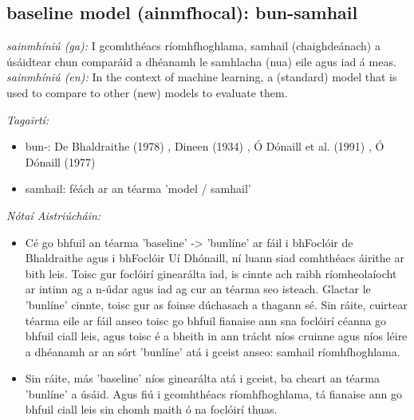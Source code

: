 \documentclass{article}
\begin{document}
\subsection*{baseline model (ainmfhocal): bun-samhail} 
 \noindent \textit{sainmhíniú (ga):} I gcomhthéacs ríomhfhoghlama, samhail (chaighdeánach) a úsáidtear chun comparáid a dhéanamh le samhlacha (nua) eile agus iad á meas.
\newline\newline
 \noindent \textit{sainmhíniú (en):} In the context of machine learning, a (standard) model that is used to compare to other (new) models to evaluate them.
\newline

 \noindent \textit{Tagairtí:}
\begin{itemize}
	\item bun-: De Bhaldraithe (1978) \cite{de-bhaldraithe}, Dineen (1934) \cite{dineen}, Ó Dónaill et al. (1991) \cite{focloir-beag}, Ó Dónaill (1977) \cite{odonaill}
	\item samhail: féách ar an téarma 'model / samhail'
\end{itemize}

 \noindent \textit{Nótaí Aistriúcháin:}
\begin{itemize}
	\item Cé go bhfuil an téarma 'baseline' -> 'bunlíne' ar fáil i bhFoclóir de Bhaldraithe agus i bhFoclóir Uí Dhónaill, ní luann siad comhthéacs áirithe ar bith leis. Toisc gur foclóirí ginearálta iad, is cinnte ach raibh ríomheolaíocht ar intinn ag a n-údar agus iad ag cur an téarma seo isteach. Glactar le 'bunlíne' cinnte, toisc gur as foinse dúchasach a thagann sé. Sin ráite, cuirtear téarma eile ar fáil anseo toisc go bhfuil fianaise ann sna foclóirí céanna go bhfuil ciall leis, agus toisc é a bheith in ann trácht níos cruinne agus níos léire a dhéanamh ar an sórt 'bunlíne' atá i gceist anseo: samhail ríomhfhoghlama.
	\item Sin ráite, más 'baseline' níos ginearálta atá i gceist, ba cheart an téarma 'bunlíne' a úsáid. Agus fiú i gcomhthéacs ríomhfhoghlama, tá fianaise ann go bhfuil ciall leis sin chomh maith ó na foclóirí thuas.
\end{itemize}
\end{document}

